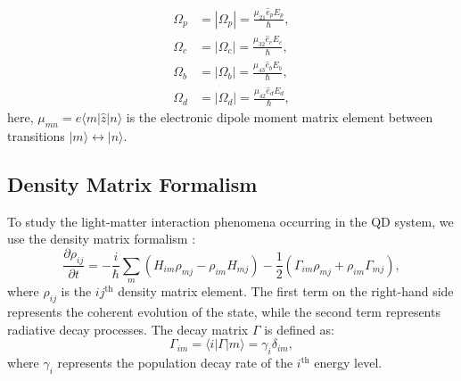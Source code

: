 \documentclass[12pt,a4paper]{article}
\begin{document}
\begin{align}
    \Omega_p &=|\Omega_p|=\frac{\mu_{21}\hat{e}_p E_p}{\hbar},\\
    \Omega_c &=|\Omega_c|=\frac{\mu_{32}\hat{e}_c E_c}{\hbar},\\
    \Omega_b &=|\Omega_b|=\frac{\mu_{43}\hat{e}_b E_b}{\hbar},\\
    \Omega_d &=|\Omega_d|=\frac{\mu_{42}\hat{e}_d E_d}{\hbar},
\end{align}
here, \(\mu_{mn}=e\langle m|\hat{z}|n\rangle\) is the electronic dipole moment matrix element between transitions \(|m\rangle\leftrightarrow |n\rangle\).

\subsection{Density Matrix Formalism}
To study the light-matter interaction phenomena occurring in the QD system, we use the density matrix formalism \cite{BOYD2008135}:
\begin{equation}
    \frac{\partial \rho_{ij}}{\partial t} = -\frac{i}{\hbar} \sum_m \left( H_{im} \rho_{mj} - \rho_{im} H_{mj} \right) - \frac{1}{2} \left( \Gamma_{im} \rho_{mj} + \rho_{im} \Gamma_{mj} \right),
\end{equation}
where \(\rho_{ij}\) is the \(ij^{\text{th}}\) density matrix element. The first term on the right-hand side represents the coherent evolution of the state, while the second term represents radiative decay processes. The decay matrix \(\Gamma\) is defined as:
\begin{equation}
    \Gamma_{im} = \langle i|\Gamma|m\rangle = \gamma_i\delta_{im},
\end{equation}
where $\gamma_i$ represents the population decay rate of the $i^{\text{th}}$ energy level.
\end{document}

